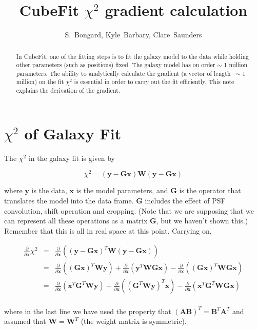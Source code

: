 \documentclass[12pt]{article}
\newcommand{\G}{\mathbf{G}}
\newcommand{\x}{\mathbf{x}}
\newcommand{\y}{\mathbf{y}}
\newcommand{\W}{\mathbf{W}}
\newcommand{\ddx}{\frac{\partial}{\partial \mathbf{x}}}
\begin{document}
\title{CubeFit $\chi^2$ gradient calculation}
\author{S.~Bongard, Kyle~Barbary, Clare~Saunders}
\maketitle
\begin{abstract}
In CubeFit, one of the fitting steps is to fit the galaxy model to the
data while holding other parameters (such as positions) fixed. The
galaxy model has on order $\sim$ 1 million parameters. The ability to
analytically calculate the gradient (a vector of length ~$\sim$ 1
million) on the fit $\chi^2$ is essential in order to carry out the fit
efficiently. This note explains the derivation of the gradient.
\end{abstract}


\section{$\chi^2$ of Galaxy Fit}

The $\chi^2$ in the galaxy fit is given by

\begin{equation}
\chi^2 = (\y - \G\x)\W(\y - \G\x)
\end{equation}

where $\y$ is the data, $\x$ is the model parameters, and $\G$ is the operator
that translates the model into the data frame. $\G$ includes the effect of PSF
convolution, shift operation and cropping. (Note that we are supposing that
we can represent all these operations as a matrix $\G$, but we haven't shown
this.) Remember that this is all in real space at this point. Carrying on,

\begin{eqnarray*}
  \label{eq:5}
  \ddx \chi^{2} & = & \ddx \left( (\y - \G\x)^{T} \W (\y - \G\x) \right)\\
                & = & \ddx \left( (\G \x)^{T} \W \y \right)
                    + \ddx \left( \y^{T} \W \G \x \right)
                    - \ddx \left( (\G \x)^{T} \W \G \x \right) \\
                & = & \ddx \left( \x^{T} \G^{T} \W \y \right)
                    + \ddx \left( (\G^{T} \W \y)^{T} \x \right)
                    - \ddx \left( \x^{T} \G^{T} \W \G \x \right) \\
\end{eqnarray*}

where in the last line we have used the property that
$(\mathbf{A}\mathbf{B})^T = \mathbf{B}^T\mathbf{A}^T$ and assumed that
$\W = \W^T$ (the weight matrix is symmetric).
\end{document}
